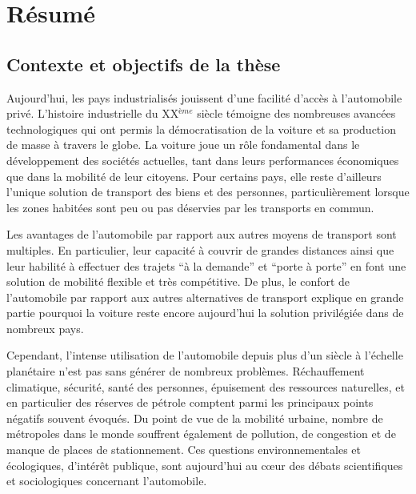 \newpage
\chapter*{Résumé}
\section*{Contexte et objectifs de la thèse}

Aujourd'hui, les pays industrialisés jouissent d'une facilité d'accès à l'automobile privé.
L'histoire industrielle du XX$^{ème}$ siècle témoigne des nombreuses avancées technologiques qui ont permis la démocratisation de la voiture et sa production de masse à travers le globe.
La voiture joue un rôle fondamental dans le développement des sociétés actuelles, tant dans leurs performances économiques que dans la mobilité de leur citoyens.
Pour certains pays, elle reste d'ailleurs l'unique solution de transport des biens et des personnes, particulièrement lorsque les zones habitées sont peu ou pas déservies par les transports en commun.

\medskip
Les avantages de l'automobile par rapport aux autres moyens de transport sont multiples.
En particulier, leur capacité à couvrir de grandes distances ainsi que leur habilité à effectuer des trajets ``à la demande'' et ``porte à porte'' en font une solution de mobilité flexible et très compétitive.
De plus, le confort de l'automobile par rapport aux autres alternatives de transport explique en grande partie pourquoi la voiture reste encore aujourd'hui la solution  privilégiée dans de nombreux pays.

\medskip
Cependant, l'intense utilisation de l'automobile depuis plus d'un siècle à l'échelle planétaire n'est pas sans générer de nombreux problèmes.
Réchauffement climatique, sécurité, santé des personnes, épuisement des ressources naturelles, et en particulier des réserves de pétrole comptent parmi les principaux points négatifs souvent évoqués.
Du point de vue de la mobilité urbaine, nombre de métropoles dans le monde souffrent également de pollution, de congestion et de manque de places de stationnement.
Ces questions environnementales et écologiques, d'intérêt publique, sont aujourd'hui au cœur des débats scientifiques et sociologiques concernant l'automobile.

